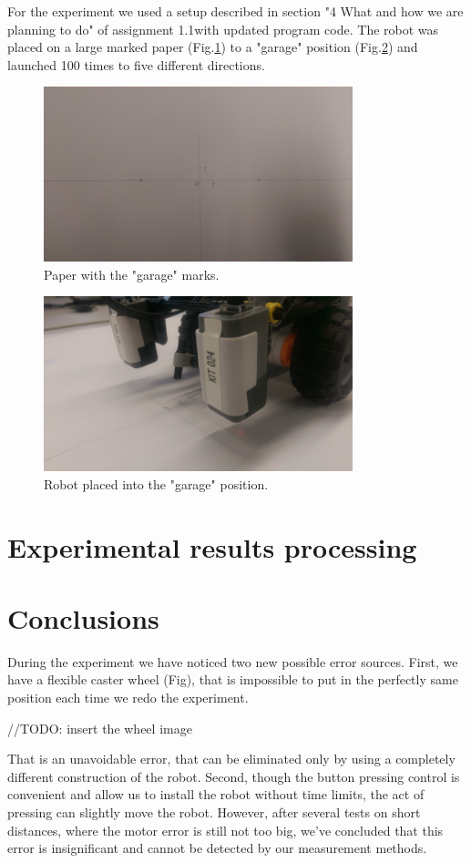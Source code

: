\documentclass[a4paper, 12pt]{article}
\begin{document}
For the experiment we used a setup described in section "4 What and how we are planning to do" of assignment 1.1with updated program code. The robot was placed on a large marked paper (Fig.\ref{fig:paper}) to a "garage" position (Fig.\ref{fig:garage}) and launched 100 times to five different directions.

\begin{figure}[h]
  \centering
  \caption{Paper with the "garage" marks.\label{fig:paper}}
  \includegraphics[width=0.8\textwidth]{markedPaper}
\end{figure}

\begin{figure}[h]
  \centering
  \caption{Robot placed into the "garage" position.\label{fig:garage}}
  \includegraphics[width=0.8\textwidth]{garage}
\end{figure}




\section{Experimental results processing}

\section{Conclusions}
During the experiment we have noticed two new possible error sources. First, we have a flexible caster wheel (Fig), that is impossible to put in the perfectly same position each time we redo the experiment. 

//TODO: insert the wheel image

That is an unavoidable error, that can be eliminated only by using a completely different construction of the robot. Second, though the button pressing control is convenient and allow us to install the robot without time limits, the act of pressing can slightly move the robot. However, after several tests on short distances, where the motor error is still not too big, we've concluded that this error is insignificant and cannot be detected by our measurement methods.
\end{document}
